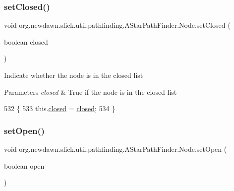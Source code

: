 \subsubsection{\texorpdfstring{set\+Closed()}{setClosed()}}
{\footnotesize\ttfamily void org.\+newdawn.\+slick.\+util.\+pathfinding.\+A\+Star\+Path\+Finder.\+Node.\+set\+Closed (\begin{DoxyParamCaption}\item[{boolean}]{closed }\end{DoxyParamCaption})\hspace{0.3cm}{\ttfamily [inline]}}

Indicate whether the node is in the closed list


\begin{DoxyParams}{Parameters}
{\em closed} & True if the node is in the closed list \\
\hline
\end{DoxyParams}

\begin{DoxyCode}
532                                               \{
533             this.\mbox{\hyperlink{classorg_1_1newdawn_1_1slick_1_1util_1_1pathfinding_1_1_a_star_path_finder_1_1_node_a5fa6d77e8305e6028fdabdb8ad5cb00f}{closed}} = \mbox{\hyperlink{classorg_1_1newdawn_1_1slick_1_1util_1_1pathfinding_1_1_a_star_path_finder_1_1_node_a5fa6d77e8305e6028fdabdb8ad5cb00f}{closed}};
534         \}
\end{DoxyCode}
\mbox{\label{classorg_1_1newdawn_1_1slick_1_1util_1_1pathfinding_1_1_a_star_path_finder_1_1_node_afd471062870a7831820925f6fd1b0f21}} 
\subsubsection{\texorpdfstring{set\+Open()}{setOpen()}}
{\footnotesize\ttfamily void org.\+newdawn.\+slick.\+util.\+pathfinding.\+A\+Star\+Path\+Finder.\+Node.\+set\+Open (\begin{DoxyParamCaption}\item[{boolean}]{open }\end{DoxyParamCaption})\hspace{0.3cm}{\ttfamily [inline]}}

